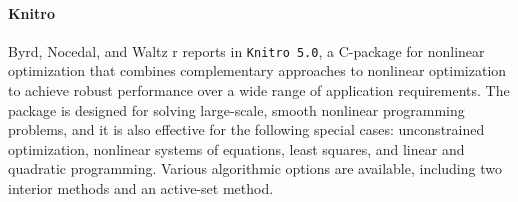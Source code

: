 \paragraph{Knitro}
    Byrd, Nocedal, and Waltz r reports in \cite{Byrd2006} \verb|Knitro 5.0|, 
a C-package for nonlinear optimization that combines complementary approaches 
to nonlinear optimization to achieve robust performance over a wide range of 
application requirements. The package  is designed for solving large-scale, 
smooth nonlinear programming problems, and it is also effective for the 
following special cases: unconstrained optimization, nonlinear systems of 
equations, least squares, and linear and quadratic programming. Various 
algorithmic options are available, including two interior methods and an 
active-set method.  